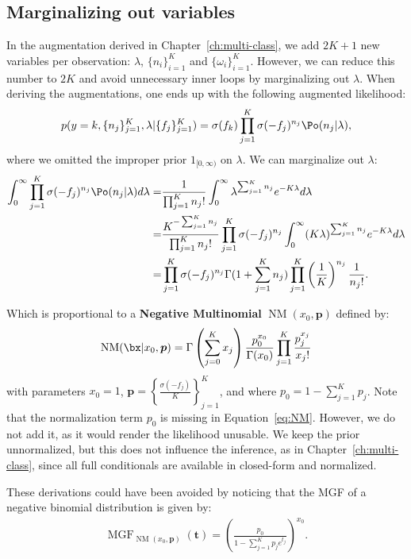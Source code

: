 \subsection{Marginalizing out variables}
\label{sec:marg_multiclass}
In the augmentation derived in Chapter~\ref{ch:multi-class}, we add $2K + 1$ new variables per observation: $\lambda$, $\{n_i\}_{i=1}^K$ and $\{\omega_i\}_{i=1}^K$.
However, we can reduce this number to $2K$ and avoid unnecessary inner loops by marginalizing out $\lambda$.
When deriving the augmentations, one ends up with the following augmented likelihood:
\begin{align}
    p(y=k, \{n_j\}_{j=1}^K, \lambda|\{f_j\}_{j=1}^K) = \sigma(f_k) \prod_{j=1}^K \sigma(-f_j)^{n_j} \Po (n_j|\lambda),
\end{align}
where we omitted the improper prior $1_{[0,\infty)}$ on $\lambda$.
We can marginalize out $\lambda$:
\begin{align}
    \int_{0}^\infty \prod_{j=1}^K \sigma(-f_j)^{n_j} \Po (n_j|\lambda)d\lambda =& \frac{1}{\prod_{j=1}^K n_j!}\int_{0}^\infty \lambda^{\sum_{j=1}^K n_j}e^{-K\lambda}d\lambda \nonumber\\
    =& \frac{K^{-\sum_{j=1}^K n_j}}{\prod_{j=1}^K n_j!}\prod_{j=1}^K \sigma(-f_j)^{n_j} \int_{0}^\infty (K\lambda)^{\sum_{j=1}^K n_j}e^{-K\lambda}d\lambda \nonumber\\
    =& \prod_{j=1}^K\sigma(-f_j)^{n_j}\Gamma(1 + \sum_{j=1}^K n_j) \prod_{j=1}^K \left(\frac{1}{K}\right)^{n_j}\frac{1}{n_j!}. \label{eq:NM}
\end{align}

Which is proportional to a \textbf{Negative Multinomial} $\operatorname{NM}(x_0, \boldsymbol{p})$ defined by:
\begin{align*}
    \operatorname{NM}(\bx|x_0,\boldsymbol{p}) = \Gamma\left(\sum_{j=0}^K x_j\right) \frac{p_0^{x_0}}{\Gamma(x_0)}\prod_{j=1}^K \frac{p_j^{x_j}}{x_j!}   
\end{align*}
with parameters $x_0=1$, $\boldsymbol{p}=\left\{\frac{\sigma(-f_j)}{K}\right\}_{j=1}^K$, and where $p_0 = 1 - \sum_{j=1}^K p_j$.
Note that the normalization term $p_0$ is missing in Equation~\eqref{eq:NM}.
However, we do not add it, as it would render the likelihood unusable.
We keep the prior unnormalized, but this does not influence the inference, as in Chapter~\ref{ch:multi-class}, since all full conditionals are available in closed-form and normalized.

These derivations could have been avoided by noticing that the \ac{MGF} of a negative binomial distribution is given by:
\begin{align*}
    \operatorname{MGF}_{\operatorname{NM}(x_0,\boldsymbol{p})}(\boldsymbol{t}) = \left(\frac{p_0}{1-\sum_{j=1}^K p_j e^{t_j}}\right)^{x_0}.
\end{align*}


